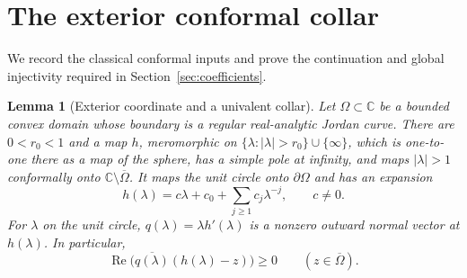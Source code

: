 \documentclass[11pt]{article}
\newtheorem{lemma}[theorem]{Lemma}
\theoremstyle{remark}\newtheorem{remark}[theorem]{Remark}
\numberwithin{equation}{section}
\begin{document}
\section{The exterior conformal collar}\label{sec:collar}
We record the classical conformal inputs and prove the continuation and global injectivity required in Section~\ref{sec:coefficients}.

\begin{lemma}[Exterior coordinate and a univalent collar]
\label{lem:exterior-collar}
Let $\Omega\subset\mathbb C$ be a bounded convex domain whose boundary
is a regular real-analytic Jordan curve. There are $0<r_0<1$ and a map
$h$, meromorphic on $\{\lambda:|\lambda|>r_0\}\cup\{\infty\}$,
which is one-to-one there as a map of the sphere, has a simple pole at
infinity, and maps $|\lambda|>1$ conformally onto
$\mathbb C\setminus\overline\Omega$. It maps the unit circle onto
$\partial\Omega$ and has an expansion
\[
 h(\lambda)=c\lambda+c_0+\sum_{j\ge1}c_j\lambda^{-j},\qquad c\ne0.
\]
For $\lambda$ on the unit circle, $q(\lambda)=\lambda h'(\lambda)$
is a nonzero outward normal vector at $h(\lambda)$. In particular,
\[
 \operatorname{Re}\bigl(\overline{q(\lambda)}(h(\lambda)-z)\bigr)
 \ge0\qquad (z\in\overline\Omega).
\]
\end{lemma}
\end{document}
